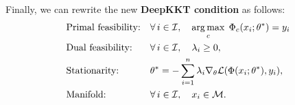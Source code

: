Finally, we can rewrite the new \textbf{DeepKKT condition} as follows:
%
\begin{equation} \label{eq:DeepKKT}
\begin{aligned}
&\text{Primal feasibility:} && 
\forall\, i \in \mathcal{I}, \quad \operatorname*{arg\,max}_c\; \Phi_c (x_i; \theta^*) = y_i \\
&\text{Dual feasibility:} && \forall\, i \in \mathcal{I}, \quad \lambda_i \geq 0, \\
&\text{Stationarity:} && \theta^* = -\sum_{i=1}^n \lambda_i \nabla_{\theta} \mathcal{L}(\Phi(x_i; \theta^*), y_i), \\
&\text{Manifold:} && \forall\, i \in \mathcal{I}, \quad x_i \in \mathcal{M}. 
\end{aligned}
\end{equation}
%




